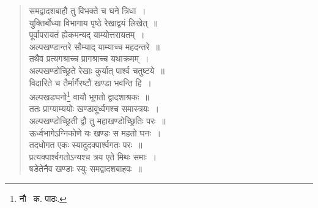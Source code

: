 \documentclass[11pt, openany]{book}
\begin{document}
\begin{quote}
{\qt समद्वादशबाहौ तु विभक्ते च घने त्रिधा~।\\
युक्तिर्बोध्या विभागाय पृष्ठे रेखाद्वयं लिखेत्~॥\\
पूर्वापरायतं ह्येकमन्यद् याम्योत्तरायतम्~।\\
अल्पखण्डान्तरे सौम्याद् याम्याच्च महदन्तरे~॥\\
तथैव प्रत्यगश्राच्च प्रागश्राच्च यथाक्रमम्~।\\
अल्पखण्डोच्छ्रिते रेखाः कुर्यात् पार्श्व चतुष्टये~॥\\
विदारिते च तैर्मार्गैरष्टौ खण्डा भवन्ति हि~।\\
अल्पखडघनो\renewcommand{\thefootnote}{२}\footnote{नौ \textendash\ क. पाठः.} वायौ भूगतो द्वादशाश्रकः~॥\\
ततः प्राग्याम्ययोः खण्डावूर्ध्वगश्च समास्त्रयः~।\\
अल्पखण्डोच्छ्रिती द्वौ तु महाखण्डोच्छ्रितिः परः~॥\\
ऊर्ध्वभागेऽग्निकोणे यः खण्डः स महतो घनः~।\\
तदधोगत एकः स्यादुदक्पार्श्वगतः परः~॥\\
प्रत्यक्पार्श्वगतोऽन्यश्च त्रय एते मिथः समाः~।\\
षडेतेनैव खण्डाः स्युः समद्वादशबाहवः~॥}
\end{quote}

\newpage
\end{document}
